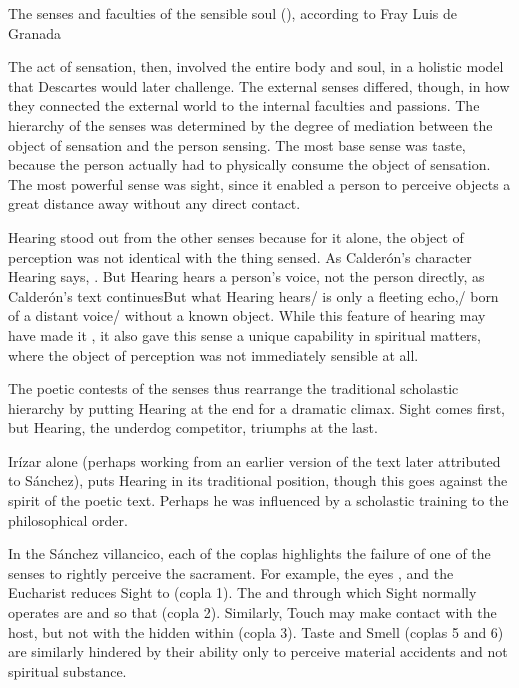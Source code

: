 {The senses and faculties of the sensible soul (),
according to Fray Luis de Granada}

The act of sensation, then, involved the entire body and soul, in a holistic
model that Descartes would later challenge.  
The external senses differed, though, in how they connected the external world
to the internal faculties and passions.
The hierarchy of the senses was determined by the degree of mediation between
the object of sensation and the person sensing.
The most base sense was taste, because the person actually had to physically
consume the object of sensation.
The most powerful sense was sight, since it enabled a person to perceive objects
a great distance away without any direct contact.

Hearing stood out from the other senses because for it alone, the object of
perception was not identical with the thing sensed.
As Calderón's character Hearing says, .%
    \Autocite[]{Calderon:Retiro}
But Hearing hears a person's voice, not the person directly, as Calderón's text
continues{But what Hearing hears/ is only a fleeting echo,/ born of a
distant voice/ without a known object}.%
    \Autocite[]{Calderon:Retiro}
While this feature of hearing may have made it , it also
gave this sense a unique capability in spiritual matters, where the object of
perception was not immediately sensible at all.

The poetic contests of the senses thus rearrange the traditional scholastic
hierarchy by putting Hearing at the end for a dramatic climax.
Sight comes first, but Hearing, the underdog competitor, triumphs at the
last.
\begin{Footnote}
    Irízar alone (perhaps working from an earlier version of the text later
    attributed to Sánchez), puts Hearing in its traditional position, though
    this goes against the spirit of the poetic text.  
    Perhaps he was influenced by a scholastic training to  the
    philosophical order.
\end{Footnote}
In the Sánchez villancico, each of the coplas highlights the failure of one of
the senses to rightly perceive the sacrament.
For example, the eyes , and the Eucharist
reduces Sight to  (copla 1).
The  and  through which Sight normally
operates are   and
 so that  (copla 2).
Similarly, Touch may make contact with the host, but not with the
 hidden within (copla 3).
Taste and Smell (coplas 5 and 6) are similarly hindered by their ability only to
perceive material accidents and not spiritual substance.

